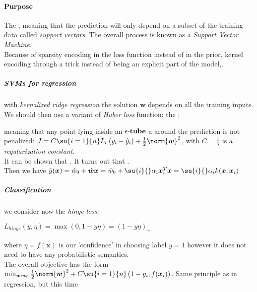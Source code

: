 \paragraph{Purpose}
The , meaning that the prediction will only depend on a
subset of the training data called \emph{support vectors}. The overall 
process is known as a \emph{Support Vector Machine}.\\
Because of sparsity encoding in the loss function instead of in the prior, 
kernel encoding through a trick instead of being an explicit part of the 
model,.
\subparagraph{SVMs for regression}
with \emph{kernalized ridge regression} the solution $\bm{w}$ depends on all 
the training inputs. We should then use a variant of \emph{Huber loss} 
function: the : 
\begin{center}
\end{center}
meaning that any point lying inside an $\epsilon\text{-\textbf{tube}}$ a
around the prediction is not penalized: $J=C\su{i=1}{n}L_{\epsilon}\left(
y_{i} - \hat{y}_{i}\right) + \frac{1}{2}\norm{\bm{w}}^{2}$, with $C=\frac{1}{
\lambda}$ is a \emph{regularization constant}.\\
It can be shown that . It turns out that .\\
Then we have $\hat{y}(\bm{x}) = \hat{w}_{0} + \hat{\bm{w}}\bm{x}  = \hat{w}_{0}
+ \su{i}{}\alpha_{i}\bm{x}_{i}^{T}\bm{x} = \su{i}{}\alpha_{i}k(\bm{x},\bm{x}_{i})$

\subparagraph{Classification}
we consider now the \emph{hinge loss}:
\begin{center}
    $L_{hinge}(y,\eta) = \max\left(0, 1-y\eta\right) = \left(1-y\eta\right)_{+}$
\end{center}
where $\eta=f(\bm{x})$ is our 'confidence' in choosing label $y=1$ however it does not
need to have any probabilistic semantics.\\
The overall objective has the form $\min_{\bm{w}:w_{0}}\frac{1}{2}\norm{\bm{w}}^{2} +
C\su{i=1}{n}\left(1-y_{i},f(\bm{x}_{i})\right)$. Same principle as in regression, but
this time 


